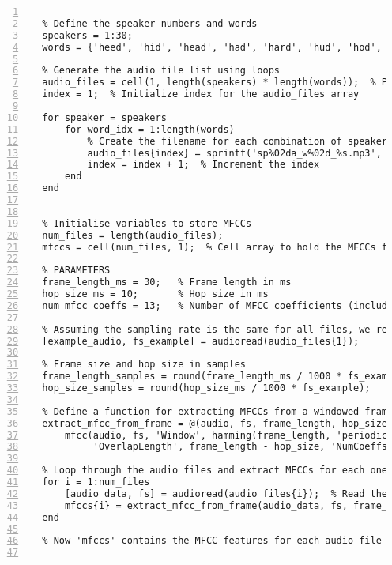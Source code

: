 \documentclass{article}
\begin{document}
\begin{lstlisting}[frame=single, numbers=left, style=Matlab-editor, caption={Develop\_Set\_Evaluation.mlx}, label={lst:Develop_Set_Evaluation}]

  % Define the speaker numbers and words
  speakers = 1:30;
  words = {'heed', 'hid', 'head', 'had', 'hard', 'hud', 'hod', 'hoard', 'hood', 'whod', 'heard'};
  
  % Generate the audio file list using loops
  audio_files = cell(1, length(speakers) * length(words));  % Preallocate cell array
  index = 1;  % Initialize index for the audio_files array
  
  for speaker = speakers
      for word_idx = 1:length(words)
          % Create the filename for each combination of speaker and word
          audio_files{index} = sprintf('sp%02da_w%02d_%s.mp3', speaker, word_idx, words{word_idx});
          index = index + 1;  % Increment the index
      end
  end
  
  
  % Initialise variables to store MFCCs
  num_files = length(audio_files);
  mfccs = cell(num_files, 1);  % Cell array to hold the MFCCs for each audio file
  
  % PARAMETERS
  frame_length_ms = 30;   % Frame length in ms
  hop_size_ms = 10;       % Hop size in ms
  num_mfcc_coeffs = 13;   % Number of MFCC coefficients (including zeroth)
  
  % Assuming the sampling rate is the same for all files, we read the first file to get fs
  [example_audio, fs_example] = audioread(audio_files{1});
  
  % Frame size and hop size in samples
  frame_length_samples = round(frame_length_ms / 1000 * fs_example);  % Convert ms to samples
  hop_size_samples = round(hop_size_ms / 1000 * fs_example);        % Convert ms to samples
  
  % Define a function for extracting MFCCs from a windowed frame
  extract_mfcc_from_frame = @(audio, fs, frame_length, hop_size, num_coeffs) ...
      mfcc(audio, fs, 'Window', hamming(frame_length, 'periodic'), ...
           'OverlapLength', frame_length - hop_size, 'NumCoeffs', num_coeffs);
  
  % Loop through the audio files and extract MFCCs for each one
  for i = 1:num_files
      [audio_data, fs] = audioread(audio_files{i});  % Read the current audio file
      mfccs{i} = extract_mfcc_from_frame(audio_data, fs, frame_length_samples, hop_size_samples, num_mfcc_coeffs);
  end
  
  % Now 'mfccs' contains the MFCC features for each audio file
  

\end{lstlisting}
\end{document}
